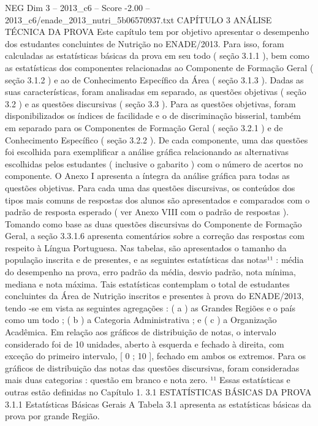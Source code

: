 \begin{textsample}{NEG Dim 3 – 2013\_c6 – Score -2.00 – 2013\_c6/enade\_2013\_nutri\_5b06570937.txt}  \label{ex:f3_neg_056}
CAPÍTULO 3 ANÁLISE TÉCNICA DA PROVA Este capítulo tem por objetivo apresentar o desempenho dos estudantes concluintes de Nutrição no ENADE/2013.
Para isso, foram calculadas as estatísticas básicas da prova em seu todo ( seção 3.1.1 ), bem como as estatísticas dos componentes relacionadas ao Componente de Formação Geral ( seção 3.1.2 ) e ao de Conhecimento Específico da Área ( seção 3.1.3 ).
Dadas as suas características, foram analisadas em separado, as questões objetivas ( seção 3.2 ) e as questões discursivas ( seção 3.3 ).
Para as questões objetivas, foram disponibilizados os índices de facilidade e o de discriminação bisserial, também em separado para os Componentes de Formação Geral ( seção 3.2.1 ) e de Conhecimento Específico ( seção 3.2.2 ).
De cada componente, uma das questões foi escolhida para exemplificar a análise gráfica relacionando as alternativas escolhidas pelos estudantes ( inclusive o gabarito ) com o número de acertos no componente.
O Anexo I apresenta a íntegra da análise gráfica para todas as questões objetivas.
Para cada uma das questões discursivas, os conteúdos dos tipos mais comuns de respostas dos alunos são apresentados e comparados com o padrão de resposta esperado ( ver Anexo VIII com o padrão de respostas ).
Tomando como base as duas questões discursivas do Componente de Formação Geral, a seção 3.3.1.6 apresenta comentários sobre a correção das respostas com respeito à Língua Portuguesa.
Nas tabelas, são apresentados o tamanho da população inscrita e de presentes, e as seguintes estatísticas das notas¹¹ : média do desempenho na prova, erro padrão da média, desvio padrão, nota mínima, mediana e nota máxima.
Tais estatísticas contemplam o total de estudantes concluintes da Área de Nutrição inscritos e presentes à prova do ENADE/2013, tendo -se em vista as seguintes agregações : ( a ) as Grandes Regiões e o país como um todo ; ( b ) a Categoria Administrativa ; e ( c ) a Organização Acadêmica.
Em relação aos gráficos de distribuição de notas, o intervalo considerado foi de 10 unidades, aberto à esquerda e fechado à direita, com exceção do primeiro intervalo, [ 0 ; 10 ], fechado em ambos os extremos.
Para os gráficos de distribuição das notas das questões discursivas, foram consideradas mais duas categorias : questão em branco e nota zero. ¹¹ Essas estatísticas e outras estão definidas no Capítulo 1. 3.1 ESTATÍSTICAS BÁSICAS DA PROVA 3.1.1 Estatísticas Básicas Gerais A Tabela 3.1 apresenta as estatísticas básicas da prova por grande Região.

\end{textsample}
